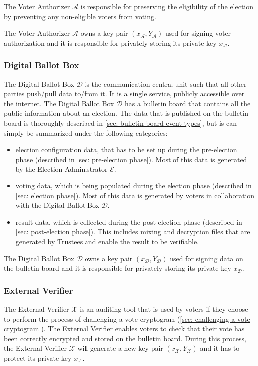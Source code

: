 The Voter Authorizer $\mathcal{A}$ is responsible for preserving the eligibility of the election by preventing any non-eligible voters from voting.

The Voter Authorizer $\mathcal{A}$ owns a key pair $(x_\mathcal{A}, Y_\mathcal{A})$ used for signing voter authorization and it is responsible for privately storing its private key $x_\mathcal{A}$.


\subsubsection{Digital Ballot Box} 
The Digital Ballot Box $\mathcal{D}$ is the communication central unit such that all other parties push/pull data to/from it. It is a single service, publicly accessible over the internet. The Digital Ballot Box $\mathcal{D}$ has a bulletin board that contains all the public information about an election. The data that is published on the bulletin board is thoroughly described in \cref{sec: bulletin board event types}, but is can simply be summarized under the following categories: 
\begin{itemize}
    \item election configuration data, that has to be set up during the pre-election phase (described in \cref{sec: pre-election phase}). Most of this data is generated by the Election Administrator $\mathcal{E}$.
    \item voting data, which is being populated during the election phase (described in \cref{sec: election phase}). Most of this data is generated by voters in collaboration with the Digital Ballot Box $\mathcal{D}$.
    \item result data, which is collected during the post-election phase (described in \cref{sec: post-election phase}). This includes mixing and decryption files that are generated by Trustees and enable the result to be verifiable.
\end{itemize}

The Digital Ballot Box $\mathcal{D}$ owns a key pair $(x_\mathcal{D}, Y_\mathcal{D})$ used for signing data on the bulletin board and it is responsible for privately storing its private key $x_\mathcal{D}$.


\subsubsection{External Verifier}
The External Verifier $\mathcal{X}$ is an auditing tool that is used by voters if they choose to perform the process of challenging a vote cryptogram (\cref{sec: challenging a vote cryptogram}). The External Verifier enables voters to check that their vote has been correctly encrypted and stored on the bulletin board. During this process, the External Verifier $\mathcal{X}$ will generate a new key pair $(x_\mathcal{X}, Y_\mathcal{X})$ and it has to protect its private key $x_\mathcal{X}$.
